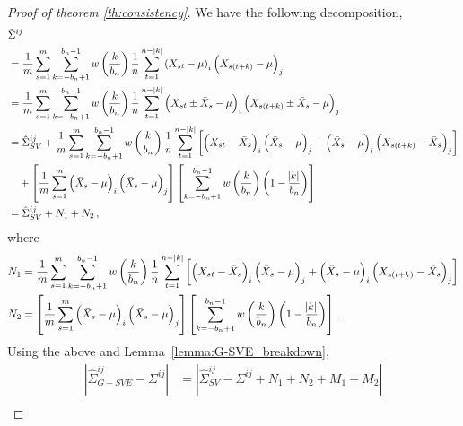 \documentclass[11pt]{article}
\newtheorem{lemma}{Lemma}
\theoremstyle{remark}
\begin{document}
%
\begin{proof}[Proof of theorem \ref{th:consistency}]
We have the following decomposition,
\begin{align*}
    &\tilde{\Sigma}^{ij} \\
    & = \dfrac{1}{m}\sum_{s=1}^{m}\sum_{k=-b_n+1}^{b_n-1}w\left(\dfrac{k}{b_n}\right)\dfrac{1}{n}\sum_{t=1}^{n-|k|}  \left(X_{st} - \mu \right)_i  \left(X_{s(t + k)} - \mu \right)_j\\
    & = \dfrac{1}{m}\sum_{s=1}^{m}\sum_{k=-b_n+1}^{b_n-1}w\left(\dfrac{k}{b_n}\right)\dfrac{1}{n}\sum_{t=1}^{n-|k|}  \left(X_{st} \pm \bar{X}_s - \mu \right)_i  \left(X_{s(t + k)} \pm \bar{X}_s - \mu \right)_j\\
    & = \hat{\Sigma}_{SV}^{ij} + \dfrac{1}{m}\sum_{s=1}^{m}\sum_{k=-b_n+1}^{b_n-1}w\left(\dfrac{k}{b_n}\right)\dfrac{1}{n}\sum_{t=1}^{n-|k|}\left[ \left(X_{st} - \bar{X}_s \right)_i   \left(\bar{X}_s - \mu \right)_j + \left(\bar{X}_s - \mu \right)_i  \left(X_{s(t+k)} - \bar{X}_s \right)_j\right]\\
    & \quad + \left[\dfrac{1}{m}  \sum_{s=1}^{m}  \left(\bar{X}_s - \mu \right)_i  \left(\bar{X}_s - \mu \right)_j \right]  \left[\sum_{k=-b_n+1}^{b_n-1}w\left(\dfrac{k}{b_n}\right)\left(1 - \dfrac{\abs{k}}{b_n}\right) \right]\\
    & = \hat{\Sigma}_{SV}^{ij} + N_1 + N_2 \,,
\end{align*}
where
\begin{align*}
N_1 & = \dfrac{1}{m}\sum_{s=1}^{m}  \sum_{k=-b_n+1}^{b_n-1}  w\left(\dfrac{k}{b_n}\right)\dfrac{1}{n}  \sum_{t=1}^{n-|k|}  \left[ \left(X_{st} - \bar{X}_s \right)_i  \left(\bar{X}_s - \mu \right)_j + \left(\bar{X}_s - \mu \right)_i  \left(X_{s(t+k)} - \bar{X}_s \right)_j\right]\\
N_2 & = \left[\dfrac{1}{m}  \sum_{s=1}^{m}  \left(\bar{X}_s - \mu \right)_i  \left(\bar{X}_s - \mu \right)_j \right]  \left[\sum_{k=-b_n+1}^{b_n-1}w\left(\dfrac{k}{b_n}\right)\left(1 - \dfrac{\abs{k}}{b_n}\right) \right]\,.
\end{align*}
%
Using the above and  Lemma~\ref{lemma:G-SVE_breakdown}, 
\begin{align*}
\left|\hat{\Sigma}_{G-SVE}^{ij} - \Sigma^{ij} \right| & = \left| \hat{\Sigma}_{SV}^{ij} - \Sigma^{ij} + N_1 + N_2 + M_1 + M_2 \right| \\

\end{align*}
\end{proof}
\end{document}
